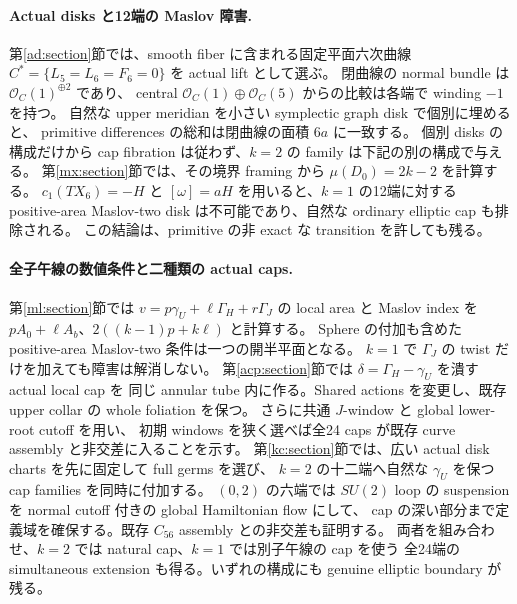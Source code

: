 \documentclass[11pt,a4paper]{article}
\theoremstyle{definition}
\begin{document}
\paragraph{Actual disks と12端の Maslov 障害.}
第\ref{ad:section}節では、smooth fiber に含まれる固定平面六次曲線
$C^*=\{L_5=L_6=F_6=0\}$ を actual lift として選ぶ。
閉曲線の normal bundle は $\mathcal O_C(1)^{\oplus2}$ であり、
central $\mathcal O_C(1)\oplus\mathcal O_C(5)$ からの比較は各端で winding $-1$ を持つ。
自然な upper meridian を小さい symplectic graph disk で個別に埋めると、
primitive differences の総和は閉曲線の面積 $6a$ に一致する。
個別 disks の構成だけから cap fibration は従わず、$k=2$ の family は下記の別の構成で与える。
第\ref{mx:section}節では、その境界 framing から $\mu(D_0)=2k-2$ を計算する。
$c_1(TX_6)=-H$ と $[\omega]=aH$ を用いると、$k=1$ の12端に対する
positive-area Maslov-two disk は不可能であり、自然な ordinary elliptic cap も排除される。
この結論は、primitive の非 exact な transition を許しても残る。

\paragraph{全子午線の数値条件と二種類の actual caps.}
第\ref{ml:section}節では $v=p\gamma_U+\ell\Gamma_H+r\Gamma_J$ の local area と Maslov index を
$pA_0+\ell A_b$、$2((k-1)p+k\ell)$ と計算する。
Sphere の付加も含めた positive-area Maslov-two 条件は一つの開半平面となる。
$k=1$ で $\Gamma_J$ の twist だけを加えても障害は解消しない。
第\ref{acp:section}節では $\delta=\Gamma_H-\gamma_U$ を潰す actual local cap を
同じ annular tube 内に作る。Shared actions を変更し、既存 upper collar の whole foliation を保つ。
さらに共通 $J$-window と global lower-root cutoff を用い、
初期 windows を狭く選べば全24 caps が既存 curve assembly と非交差に入ることを示す。
第\ref{kc:section}節では、広い actual disk charts を先に固定して full germs を選び、
$k=2$ の十二端へ自然な $\gamma_U$ を保つ cap families を同時に付加する。
$(0,2)$ の六端では $SU(2)$ loop の suspension を normal cutoff 付きの global Hamiltonian flow にして、
cap の深い部分まで定義域を確保する。既存 $C_{56}$ assembly との非交差も証明する。
両者を組み合わせ、$k=2$ では natural cap、$k=1$ では別子午線の cap を使う
全24端の simultaneous extension も得る。いずれの構成にも genuine elliptic boundary が残る。
\end{document}
